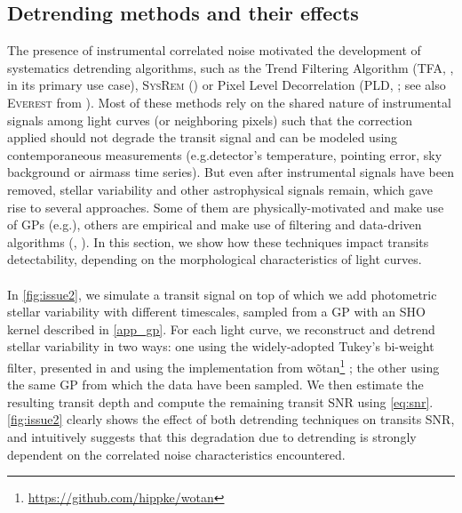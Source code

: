 \documentclass[modern,linenumbers]{aastex631}
\begin{document}
\subsection{Detrending methods and their effects}\label{detrending_effect}
The presence of instrumental correlated noise motivated the development of systematics detrending algorithms, such as the Trend Filtering Algorithm (\textsc{TFA}, \citealt{tfa}, in its primary use case), \textsc{SysRem} (\citealt{sysrem}) or Pixel Level Decorrelation (\textsc{PLD}, \citealt{pld}; see also \textsc{Everest} from \citealt{everest1, everest2}). Most of these methods rely on the shared nature of instrumental signals among light curves (or neighboring pixels) such that the correction applied should not degrade the transit signal and can be modeled using contemporaneous measurements (e.g.\;detector's temperature, pointing error, sky background or airmass time series). But even after instrumental signals have been removed, stellar variability and other astrophysical signals remain, which gave rise to several approaches. Some of them are physically-motivated and make use of GPs (e.g.\;\citealt{k2sc}), others are empirical and make use of filtering and data-driven algorithms (\citealt{Jenkins2010}, \citealt{wotan}). In this section, we show how these techniques impact transits detectability, depending on the morphological characteristics of light curves.\\\\
In \autoref{fig:issue2}, we simulate a transit signal on top of which we add photometric stellar variability with different timescales, sampled from a GP with an SHO kernel described in \autoref{app_gp}. For each light curve, we reconstruct and detrend stellar variability in two ways: one using the widely-adopted Tukey's bi-weight filter, presented in \cite{tukey} and using the implementation from \textsf{wõtan}\footnote{\href{https://github.com/hippke/wotan}{https://github.com/hippke/wotan}} \citep{wotan}; the other using the same GP from which the data have been sampled. We then estimate the resulting transit depth and compute the remaining transit SNR using \autoref{eq:snr}. \autoref{fig:issue2} clearly shows the effect of both detrending techniques on transits SNR, and intuitively suggests that this degradation due to detrending is strongly dependent on the correlated noise characteristics encountered.
\end{document}
